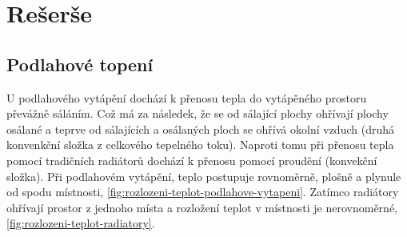 

\chapter{Rešerše}


\section{Podlahové topení}
U podlahového vytápění dochází k přenosu tepla do vytápěného prostoru převážně sáláním. Což má za následek, že se od sálající plochy ohřívají plochy osálané a teprve od sálajících a osálaných ploch se ohřívá okolní vzduch (druhá konvenkční složka z celkového tepelného toku). Naproti tomu při přenosu tepla pomocí tradičních radiátorů dochází k přenosu pomocí proudění (konvekční složka). Při podlahovém vytápění, teplo postupuje rovnoměrně, plošně a plynule od spodu místnosti, \ref{fig:rozlozeni-teplot-podlahove-vytapeni}. Zatímco radiátory ohřívají prostor z jednoho místa a rozložení teplot v místnosti je nerovnoměrné, \ref{fig:rozlozeni-teplot-radiatory}.

